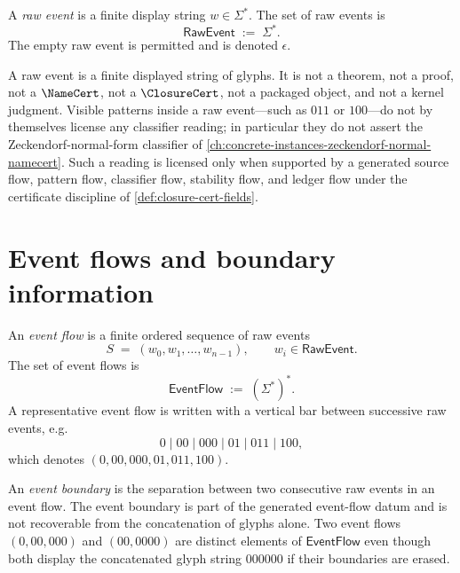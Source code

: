 \begin{definition}
\label{def:ground-event-flow-raw-event}
A \emph{raw event} is a finite display string $w \in \Sigma^{*}$. The set of raw events is
$$
  \mathsf{RawEvent} \;:=\; \Sigma^{*}.
$$
The empty raw event is permitted and is denoted $\epsilon$.
\end{definition}

\begin{remark}
\label{rem:ground-event-flow-raw-event-not-theorem}
A raw event is a finite displayed string of glyphs. It is not a theorem, not a proof, not a $\NameCert$, not a $\ClosureCert$, not a packaged object, and not a kernel judgment. Visible patterns inside a raw event---such as $011$ or $100$---do not by themselves license any classifier reading; in particular they do not assert the Zeckendorf-normal-form classifier of \autoref{ch:concrete-instances-zeckendorf-normal-namecert}. Such a reading is licensed only when supported by a generated source flow, pattern flow, classifier flow, stability flow, and ledger flow under the certificate discipline of \autoref{def:closure-cert-fields}.
\end{remark}

\section{Event flows and boundary information}
\label{sec:ground-event-flow-flows}

\begin{definition}
\label{def:ground-event-flow-event-flow}
An \emph{event flow} is a finite ordered sequence of raw events
$$
  S \;=\; (w_{0}, w_{1}, \ldots, w_{n-1}),
  \qquad
  w_{i} \in \mathsf{RawEvent}.
$$
The set of event flows is
$$
  \mathsf{EventFlow} \;:=\; (\Sigma^{*})^{*}.
$$
A representative event flow is written with a vertical bar between successive raw events, e.g.
$$
  0 \mid 00 \mid 000 \mid 01 \mid 011 \mid 100,
$$
which denotes $(0, 00, 000, 01, 011, 100)$.
\end{definition}

\begin{definition}
\label{def:ground-event-flow-event-boundary}
An \emph{event boundary} is the separation between two consecutive raw events in an event flow. The event boundary is part of the generated event-flow datum and is not recoverable from the concatenation of glyphs alone. Two event flows $(0, 00, 000)$ and $(00, 0000)$ are distinct elements of $\mathsf{EventFlow}$ even though both display the concatenated glyph string $000000$ if their boundaries are erased.
\end{definition}

